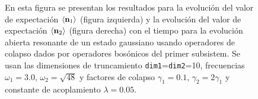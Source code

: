 \documentclass{report} %
\newcommand{\lgg}{\langle}
\newcommand{\rgg}{\rangle}
\numberwithin{equation}{section}
\begin{document}
\begin{figure}
    \centering
    \qquad
    \caption{En esta figura se presentan los resultados para la evolución del valor de expectación $\lgg {\bf n}_1 \rgg$ (figura izquierda) y la evolución del valor de expectación $\lgg {\bf n}_2 \rgg$ (figura derecha) con el tiempo para la evolución abierta resonante de un estado gaussiano usando operadores de colapso dados por operadores bosónicos del primer subsistem. Se usan las dimensiones de truncamiento \texttt{dim1}=\texttt{dim2}=10, frecuencias $\omega_1 = 3.0$, $\omega_2 = \sqrt{48}$ y factores de colapso $\gamma_1 = 0.1$, $\gamma_2 = 2 \gamma_1$ y constante de acoplamiento $\lambda = 0.05$.}
    \label{ocupations_open1_res}
\end{figure}
\end{document}
